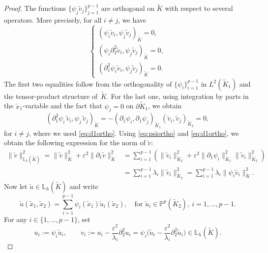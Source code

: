 \documentclass[10pt,a4paper]{amsart}
\newcommand{\IL}{\mathbb{L}}
\newcommand{\IP}{\mathbb{P}}
\newcommand{\Kt}{\widetilde{K}}
\newcommand{\eps}{\varepsilon}
\begin{document}
\begin{proof}
	The functions $\{\psi_j  \tilde v_j\}_{j=1}^{p-1}$ 
    are orthogonal on $\Kt$ with respect to several operators. More precisely, for all $i \neq j$, we have
	\begin{equation}\label{eq:psiortho}
	\begin{cases}
	( \psi_i  \tilde v_i, \psi_j  \tilde v_j )_{\Kt} = 0,\\
	(\psi_i  \partial_2^2 \tilde v_i, \psi_j  \tilde v_j )_{\Kt} = 0,\\
	( \partial_1^2 \psi_i  \tilde v_i, \psi_j  \tilde v_j )_{\Kt} = 0.
	\end{cases}
	\end{equation}
	The first two equalities follow from the orthogonality of $\{\psi_i\}_{i=1}^{p-1}$ in $L^2(\Kt_1)$ and the tensor-product structure of~$\Kt$. For the last one, using integration by parts in the $\widetilde x_1$-variable and the fact that $\psi_j=0$ on $\partial\Kt_1$, we obtain
	\begin{equation*}
	(\partial_1^2\psi_i\,\tilde v_i,\psi_j\,\tilde v_j)_{\Kt}
	=
	-(\partial_1\psi_i,\partial_1\psi_j)_{\Kt_1}
	(\tilde v_i,\tilde v_j)_{\Kt_2}
	=0,
	\end{equation*}
	for \(i\neq j\), where we used \eqref{eq:d1ortho}.
	Using \eqref{eq:psiortho} and \eqref{eq:d1ortho}, we obtain the following expression for the norm of $\tilde v$:
	\begin{equation}\label{eq:norm-psiortho}
		\begin{split}
			\|\tilde v\|_{\mathbb L_h(\Kt)}^2
			=
			\|\tilde v\|_{\Kt}^2
			+\eps^2\|\partial_1\tilde v\|_{\Kt}^2
			&=
			\sum_{i=1}^{p-1}
			\left(
			\|\tilde v_i\|_{\Kt_2}^2
			+\eps^2\|\partial_1\psi_i\|_{\Kt_1}^2
			\|\tilde v_i\|_{\Kt_2}^2
			\right)
			\\
			&=
			\sum_{i=1}^{p-1}\lambda_i\|\tilde v_i\|_{\Kt_2}^2
			=
			\sum_{i=1}^{p-1}\lambda_i\|\psi_i\tilde v_i\|_{\Kt}^2 .
		\end{split}
	\end{equation}
	Now let \(\tilde u\in \IL_h(\Kt)\) and write 
	\begin{equation*}
	\tilde u(\widetilde x_1,\widetilde x_2)
	=
	\sum_{i=1}^{p-1}\psi_i(\widetilde x_1)\tilde u_i(\widetilde x_2),
	\quad  \text{for } \tilde{u}_i\in \IP^p(\Kt_2), \ i = 1, \ldots, p-1.
	\end{equation*}
	For any $i\in\{1,\dots,p-1\}$, set
	\begin{equation*}
	u_i:=\psi_i\tilde u_i,
	\qquad
	v_i:=u_i-\frac{\eps^2}{\lambda_i}\partial_2^2u_i
	=
	\psi_i\Big(\tilde u_i-\frac{\eps^2}{\lambda_i}\partial_2^2\tilde u_i\Big)\in \IL_h(\Kt).
	\end{equation*}
    

\end{proof}
\end{document}
